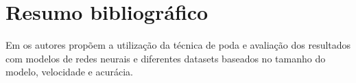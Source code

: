 
\section{Resumo bibliográfico}
Em \cite{blalock2020} os autores propõem a utilização da técnica de poda e avaliação dos resultados com modelos de redes neurais e diferentes datasets baseados no tamanho do modelo, velocidade e acurácia.

